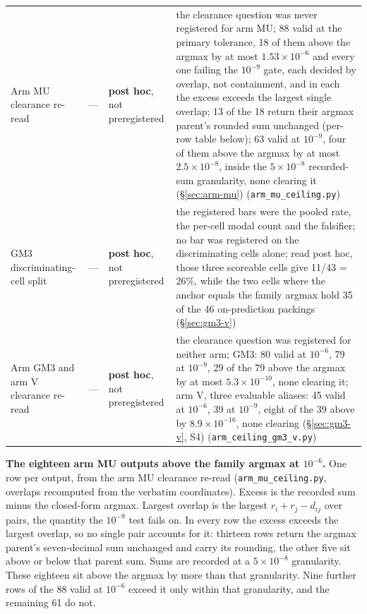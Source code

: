 \begin{longtable}{@{}p{}p{}p{}p{}@{}}
Arm MU clearance re-read & --- & \textbf{post hoc}, not preregistered & the clearance question was never registered for arm MU; 88 valid at the primary tolerance, 18 of them above the argmax by at most $1.53\times10^{-6}$ and every one failing the $10^{-9}$ gate, each decided by overlap, not containment, and in each the excess exceeds the largest single overlap; 13 of the 18 return their argmax parent's rounded sum unchanged (per-row table below); 63 valid at $10^{-9}$, four of them above the argmax by at most $2.5\times10^{-8}$, inside the $5\times10^{-8}$ recorded-sum granularity, none clearing it (\S\ref{sec:arm-mu}) (\texttt{arm\_mu\_ceiling.py}) \\
GM3 discriminating-cell split & --- & \textbf{post hoc}, not preregistered & the registered bars were the pooled rate, the per-cell modal count and the falsifier; no bar was registered on the discriminating cells alone; read post hoc, those three scoreable cells give 11/43 = 26\%, while the two cells where the anchor equals the family argmax hold 35 of the 46 on-prediction packings (\S\ref{sec:gm3-v}) \\
Arm GM3 and arm V clearance re-read & --- & \textbf{post hoc}, not preregistered & the clearance question was registered for neither arm; GM3: 80 valid at $10^{-6}$, 79 at $10^{-9}$, 29 of the 79 above the argmax by at most $5.3\times10^{-10}$, none clearing it; arm V, three evaluable aliases: 45 valid at $10^{-6}$, 39 at $10^{-9}$, eight of the 39 above by $8.9\times10^{-16}$, none clearing (\S\ref{sec:gm3-v}, S4) (\texttt{arm\_ceiling\_gm3\_v.py}) \\
\end{longtable}
\endgroup

\textbf{The eighteen arm MU outputs above the family argmax at $10^{-6}$.} One row per
output, from the arm MU clearance re-read (\texttt{arm\_mu\_ceiling.py}, overlaps
recomputed from the verbatim coordinates). Excess is the recorded sum minus the closed-form
argmax. Largest overlap is the largest $r_i + r_j - d_{ij}$ over pairs, the quantity the
$10^{-9}$ test fails on. In every row the excess exceeds the largest overlap, so no single
pair accounts for it: thirteen rows return the argmax parent's seven-decimal sum unchanged
and carry its rounding, the other five sit above or below that parent sum. Sums are recorded
at a $5\times10^{-8}$ granularity. These eighteen sit above the argmax by more than that
granularity. Nine further rows of the 88 valid at $10^{-6}$ exceed it only within that
granularity, and the remaining 61 do not.


